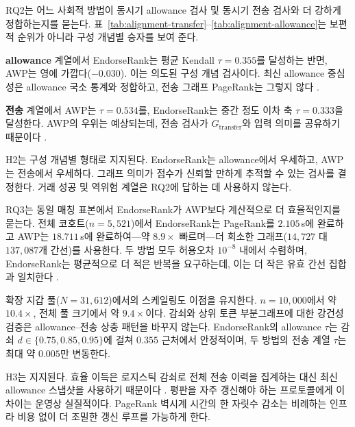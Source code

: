 
RQ2는 어느 사회적 방법이 동시기 allowance 검사 및 동시기 전송 검사와 더 강하게 정합하는지를 묻는다. 표~\ref{tab:alignment-transfer}--\ref{tab:alignment-allowance}는 보편적 순위가 아니라 구성 개념별 승자를 보여 준다.

\textbf{allowance} 계열에서 EndorseRank는 평균 Kendall $\tau=0.355$를 달성하는 반면, AWP는 영에 가깝다($-0.030$). 이는 의도된 구성 개념 검사이다. 최신 allowance 중심성은 allowance 국소 통계와 정합하고, 전송 그래프 PageRank는 그렇지 않다 .

\textbf{전송} 계열에서 AWP는 $\tau=0.534$를, EndorseRank는 중간 정도 이차 축 $\tau=0.333$을 달성한다. AWP의 우위는 예상되는데, 전송 검사가 $G_{\text{transfer}}$와 입력 의미를 공유하기 때문이다 .

H2는 구성 개념별 형태로 지지된다. EndorseRank는 allowance에서 우세하고, AWP는 전송에서 우세하다. 그래프 의미가 점수가 신뢰할 만하게 추적할 수 있는 검사를 결정한다. 거래 성공 및 역위험 계열은 RQ2에 답하는 데 사용하지 않는다.


RQ3는 동일 매칭 표본에서 EndorseRank가 AWP보다 계산적으로 더 효율적인지를 묻는다. 전체 코호트($n=5{,}521$)에서 EndorseRank는 PageRank를 $2.105$\,s에 완료하고 AWP는 $18.711$\,s에 완료하여---약 $8.9\times$ 빠르며---더 희소한 그래프($14{,}727$ 대 $137{,}087$개 간선)를 사용한다. 두 방법 모두 허용오차 $10^{-8}$ 내에서 수렴하며, EndorseRank는 평균적으로 더 적은 반복을 요구하는데, 이는 더 작은 유효 간선 집합과 일치한다 .

확장 지갑 풀($N=31{,}612$)에서의 스케일링도 이점을 유지한다. $n=10{,}000$에서 약 $10.4\times$, 전체 풀 크기에서 약 $9.4\times$이다. 감쇠와 상위 토큰 부분그래프에 대한 강건성 검증은 allowance--전송 상충 패턴을 바꾸지 않는다. EndorseRank의 allowance $\tau$는 감쇠 $d \in \{0.75, 0.85, 0.95\}$에 걸쳐 $0.355$ 근처에서 안정적이며, 두 방법의 전송 계열 $\tau$는 최대 약 $0.005$만 변동한다.

H3는 지지된다. 효율 이득은 로지스틱 감쇠로 전체 전송 이력을 집계하는 대신 최신 allowance 스냅샷을 사용하기 때문이다 . 평판을 자주 갱신해야 하는 프로토콜에게 이 차이는 운영상 실질적이다. PageRank 벽시계 시간의 한 자릿수 감소는 비례하는 인프라 비용 없이 더 조밀한 갱신 루프를 가능하게 한다.


